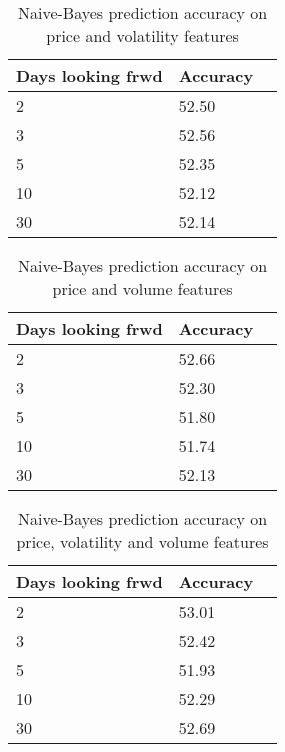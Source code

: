 \documentclass{article}
\begin{document}
\begin{table}[!h]
\begin{center}
    \begin{tabular}{ | l | l | p{3cm} |}
    \hline
    Days looking frwd & Accuracy \\ \hline
    2 & 52.50  \\ \hline
    3 & 52.56  \\ \hline
    5 & 52.35  \\ \hline
    10 & 52.12  \\ \hline
    30 & 52.14 \\ 
    \hline
    \end{tabular}
\caption{Naive-Bayes prediction accuracy on price and volatility features}
\end{center}
\end{table}

\begin{table}[!h]
\begin{center}
    \begin{tabular}{ | l | l | p{3cm} |}
    \hline
    Days looking frwd & Accuracy \\ \hline
    2 & 52.66  \\ \hline
    3 & 52.30  \\ \hline
    5 & 51.80  \\ \hline
    10 & 51.74  \\ \hline
    30 & 52.13 \\ 
    \hline
    \end{tabular}
\caption{Naive-Bayes prediction accuracy on price and volume features}
\end{center}
\end{table}

\begin{table}[!h]
\begin{center}
    \begin{tabular}{ | l | l | p{3cm} |}
    \hline
    Days looking frwd & Accuracy \\ \hline
    2 & 53.01  \\ \hline
    3 & 52.42  \\ \hline
    5 & 51.93  \\ \hline
    10 & 52.29  \\ \hline
    30 & 52.69 \\ 
    \hline
    \end{tabular}
\caption{Naive-Bayes prediction accuracy on price, volatility and volume features}
\end{center}
\end{table}
\end{document}
